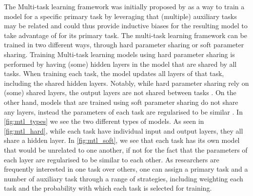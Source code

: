 The Multi-task learning framework was initially proposed by \citet{Caruana:1997} as a way to train a model for a specific primary task by leveraging that (multiple) auxiliary tasks may be related and could thus provide inductive biases for the resulting model to take advantage of for its primary task. The multi-task learning framework can be trained in two different ways, through hard parameter sharing or soft parameter sharing. Training Multi-task learning models using hard parameter sharing is performed by having (some) hidden layers in the model that are shared by all tasks. When training each task, the model updates all layers of that task, including the shared hidden layers. Notably, while hard parameter sharing rely on (some) shared layers, the output layers are not shared between tasks \cite{CITE: Hard parameter sharing paper}. On the other hand, models that are trained using soft parameter sharing do not share any layers, instead the parameters of each task are regularised to be similar \cite{CITE: Soft parameter sharing paper - See Sebastian Ruder's blogpost on MTL for reference}. In \autoref{fig:mtl_types} we see the two different types of models. As seen in \autoref{fig:mtl_hard}, while each task have individual input and output layers, they all share a hidden layer. In \autoref{fig:mtl_soft}, we see that each task has its own model that would be unrelated to one another, if not for the fact that the parameters of each layer are regularised to be similar to each other. As researchers are frequently interested in one task over others, one can assign a primary task and a number of auxiliary task through a range of strategies, including weighting each task and the probability with which each task is selected for training.


